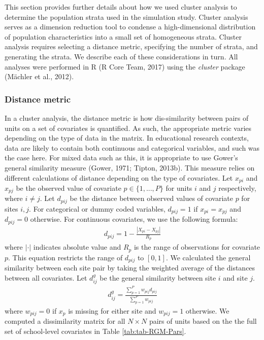 \documentclass[
  english,
  man,floatsintext]{apa6}
\begin{document}
This section provides further details about how we used cluster analysis to determine the population strata used in the simulation study.
Cluster analysis serves as a dimension reduction tool to condense a high-dimensional distribution of population characteristics into a small set of homogeneous strata. Cluster analysis requires selecting a distance metric, specifying the number of strata, and generating the strata. We describe each of these considerations in turn. All analyses were performed in R (R Core Team, 2017) using the \emph{cluster} package (Mächler et al., 2012).

\hypertarget{distance-metric}{%
\subsubsection{Distance metric}\label{distance-metric}}

In a cluster analysis, the distance metric is how dis-similarity between pairs of units on a set of covariates is quantified. As such, the appropriate metric varies depending on the type of data in the matrix.
In educational research contexts, data are likely to contain both continuous and categorical variables, and such was the case here. For mixed data such as this, it is appropriate to use Gower's general similarity measure (Gower, 1971; Tipton, 2013b). This measure relies on different calculations of distance depending on the type of covariates. Let \(x_{pi}\) and \(x_{pj}\) be the observed value of covariate \(p \in \{1, ..., P\}\) for units \(i\) and \(j\) respectively, where \(i \ne j\). Let \(d_{pij}\) be the distance between observed values of covariate \(p\) for sites \(i,j\). For categorical or dummy coded variables, \(d_{pij} = 1\) if \(x_{pi} = x_{pj}\) and \(d_{pij} = 0\) otherwise. For continuous covariates, we use the following formula:
\begin{align}
\label{eq:gowerdist-p}
d_{pij} = 1 - \frac{|X_{pi} - X_{pj}|}{R_p}
\end{align}
where \(|\cdot|\) indicates absolute value and \(R_p\) is the range of observations for covariate \(p\). This equation restricts the range of \(d_{pij}\) to \([0,1]\). We calculated the general similarity between each site pair by taking the weighted average of the distances between all covariates. Let \(d^{g}_{ij}\) be the general similarity between site \(i\) and site \(j\).
\begin{align}
\label{eq:gowerdist}
d^{g}_{ij} = \frac{\sum^P_{p = 1} w_{pij} d_{pij}}{\sum^P_{p = 1} w_{pij}}
\end{align}
where \(w_{pij} = 0\) if \(x_p\) is missing for either site and \(w_{pij} = 1\) otherwise.
We computed a dissimilarity matrix for all \(N \times N\) pairs of units based on the the full set of school-level covariates in Table \ref{tab:tab-RGM-Pars}.
\end{document}
